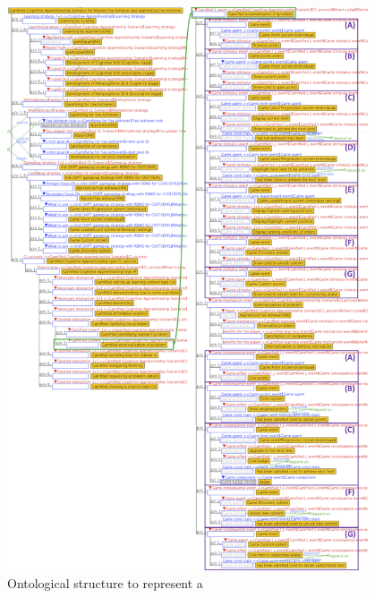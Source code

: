 \begin{figure}[!htbp]
 \caption[Ontological structure to represent a \emph{Gamified Cognitive Apprenticeship Scenario for Master/Yee Achiever and Apprentice/Yee Achiever}]{Ontological structure to represent a }
 \label{fig:ontological-structure-cognitive-apprenticeship-master-achiever-apprentice-achiever}
 \centering
 \includegraphics[width=0.95\textwidth]{images/chap-ontogacles2/ontological-structure-cognitive-apprenticeship-master-achiever-apprentice-achiever.png}
 \fautor
\end{figure}
\newpage



